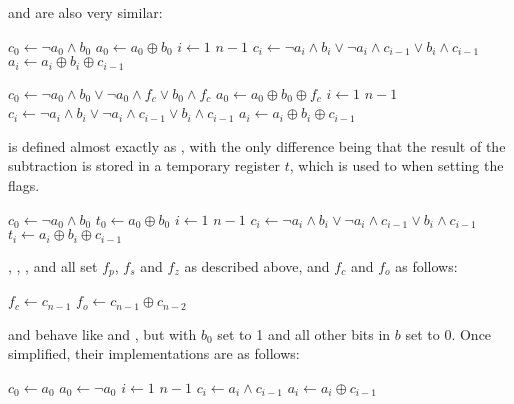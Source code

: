 \documentclass[a4paper,11pt]{kth-mag}
\renewcommand{\gets}{\leftarrow}
\newcommand{\AND}{\land}
\newcommand{\IOR}{\lor}
\newcommand{\XOR}{\oplus}
\newcommand{\NOT}{\lnot}
\begin{document}
 and  are also very similar:

\begin{codebox}
\zi $c_0 \gets \NOT a_0 \AND b_0$
\zi $a_0 \gets a_0 \XOR b_0$
\zi \For $i \gets 1$ \To $n-1$
\zi \Do
      $c_i \gets \NOT a_i \AND b_i \IOR \NOT a_i \AND c_{i-1} \IOR b_i \AND c_{i-1}$
\zi   $a_i \gets a_i \XOR b_i \XOR c_{i-1}$
    \End
\end{codebox}

\begin{codebox}
\zi   $c_0 \gets \NOT a_0 \AND b_0 \IOR \NOT a_0 \AND f_c \IOR b_0 \AND f_c$
\zi   $a_0 \gets a_0 \XOR b_0 \XOR f_c$
\zi \For $i \gets 1$ \To $n-1$
\zi \Do
      $c_i \gets \NOT a_i \AND b_i \IOR \NOT a_i \AND c_{i-1} \IOR b_i \AND c_{i-1}$
\zi   $a_i \gets a_i \XOR b_i \XOR c_{i-1}$
    \End
\end{codebox}

 is defined almost exactly as , with the only difference being that the result of the subtraction is stored in a temporary register $t$, which is used to when setting the flags.

\begin{codebox}
\zi $c_0 \gets \NOT a_0 \AND b_0$
\zi $t_0 \gets a_0 \XOR b_0$
\zi \For $i \gets 1$ \To $n-1$
\zi \Do
      $c_i \gets \NOT a_i \AND b_i \IOR \NOT a_i \AND c_{i-1} \IOR b_i \AND c_{i-1}$
\zi   $t_i \gets a_i \XOR b_i \XOR c_{i-1}$
    \End
\end{codebox}

, , ,  and  all set $f_p$, $f_s$ and $f_z$ as described above, and $f_c$ and $f_o$ as follows: %

\begin{codebox}
\zi $f_c \gets c_{n-1}$
\zi $f_o \gets c_{n-1} \XOR c_{n-2}$
\end{codebox}

 and  behave like  and , but with $b_0$ set to 1 and all other bits in $b$ set to 0.
Once simplified, their implementations are as follows:

\begin{codebox}
\zi $c_0 \gets a_0$
\zi $a_0 \gets \NOT a_0$
\zi \For $i \gets 1$ \To $n-1$
\zi \Do
      $c_i \gets a_i \AND c_{i-1}$
\zi   $a_i \gets a_i \XOR c_{i-1}$
    \End
\end{codebox}
\end{document}

